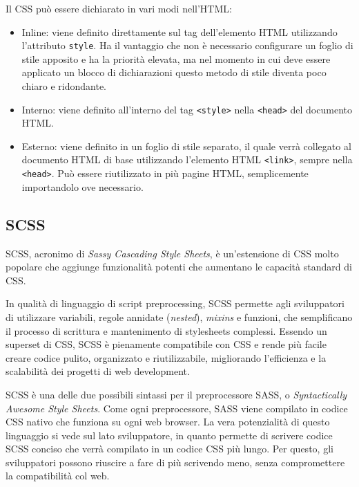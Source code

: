 Il CSS può essere dichiarato in vari modi nell'HTML:
\begin{itemize}
    \item Inline: viene definito direttamente sul tag dell'elemento HTML utilizzando l'attributo \Verb_style_. Ha il vantaggio che non è necessario configurare un foglio di stile apposito e ha la priorità elevata, ma nel momento in cui deve essere applicato un blocco di dichiarazioni questo metodo di stile diventa poco chiaro e ridondante.
    \item Interno: viene definito all'interno del tag \Verb_<style>_ nella \Verb_<head>_ del documento HTML.
    \item Esterno: viene definito in un foglio di stile separato, il quale verrà collegato al documento HTML di base utilizzando l'elemento HTML \Verb_<link>_, sempre nella \Verb_<head>_. Può essere riutilizzato in più pagine HTML, semplicemente importandolo ove necessario.
\end{itemize}

\subsection{SCSS}
SCSS, acronimo di \textit{Sassy Cascading Style Sheets}, è un'estensione di CSS molto popolare che aggiunge funzionalità potenti che aumentano le capacità standard di CSS.

In qualità di linguaggio di script preprocessing, SCSS permette agli sviluppatori di utilizzare variabili, regole annidate (\textit{nested}), \textit{mixins} e funzioni, che semplificano il processo di scrittura e mantenimento di stylesheets complessi. Essendo un superset di CSS, SCSS è pienamente compatibile con CSS e rende più facile creare codice pulito, organizzato e riutilizzabile, migliorando l'efficienza e la scalabilità dei progetti di web development.


SCSS è una delle due possibili sintassi per il preprocessore SASS, o \textit{Syntactically Awesome Style Sheets}. Come ogni preprocessore, SASS viene compilato in codice CSS nativo che funziona su ogni web browser. La vera potenzialità di questo linguaggio si vede sul lato sviluppatore, in quanto permette di scrivere codice SCSS conciso che verrà compilato in un codice CSS più lungo. Per questo, gli sviluppatori possono riuscire a fare di più scrivendo meno, senza compromettere la compatibilità col web.

